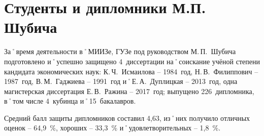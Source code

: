﻿\section{Студенты и дипломники М.П. Шубича}
За˚время деятельности в˚МИИЗе, ГУЗе под руководством М.\,П.~Шубича подготовлено и˚успешно защищено 4~диссертации на˚соискание учёной степени кандидата экономических наук: К.\,Ч.~Исмаилова \--- 1984~год, Н.\,В.~Филиппович \--- 1987~год, В.\,М.~Гаджиева \--- 1991~год и˚Е.\,А.~Дуплицкая \--- 2013~год, одна магистерская диссертация Е.\,В.~Ражина \--- 2017~год; выпущено 226~дипломника, в˚том числе 4~кубинца и˚15~бакалавров.

Средний балл защиты дипломников составил 4,63, из˚них получило отличных оценок \--- 64,9~\%, хороших \--- 33,3~\% и˚удовлетворительных \--- 1,8~\%.
